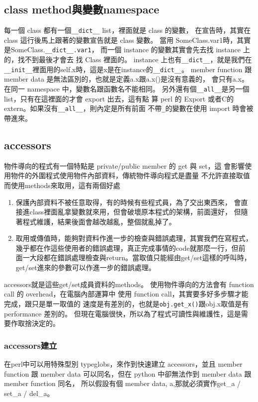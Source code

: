   \subsection{class method與變數namespace}
  每一個 class 都有一個\verb=__dict__= list，裡面就是 class 的變數，
  在宣告時，其實在 class 這行後馬上跟著的變數宣告就是 class 變數。
  當用 SomeClass.var1時，其實是SomeClass.\verb=__dict__.var1=，
  而一個 instance 的變數其實會先去找 instance 上的，找不到最後才會去
  找 Class 裡面的。 instance 上也有\verb=__dict__=，就是我們在
  \verb=__init__=裡面用的self.x時，這是x是在instance的\verb=__dict__=。
  member function 跟 member data 是無法區別的，也就是定義a.x跟a.x()是沒有意義的，
  會只有a.x。在同一 namespace 中，變數名跟函數名不能相同。
  另外還有個\verb=__all__=是另一個 list，只有在這裡面的才會 export 出去，這有點
  算 perl 的 Export 或者C的 extern。如果沒有\verb=__all__=，則內定是所有前面
  不帶\verb=_=的變數在使用 import 時會被帶進來。

  \subsection{accessors}
  物件導向的程式有一個特點是 private/public member 的 get 與 set，這
  會影響使用物件的外圍程式使用物件內部資料，傳統物件導向程式是盡量
  不允許直接取值而使用methods來取用，這有兩個好處
  \begin{enumerate}
  \item 保護內部資料不被任意取得，有的時候有些程式員，為了交出東西來，
    會直接進class裡面亂拿變數就來用，但會破壞原本程式的架構，前面還好，
    但隨著程式維護，結果後面會越改越亂，整個就亂掉了。
  \item 取用或傳值時，能夠對資料作進一步的檢查與錯誤處理，其實我們在寫程式，
    幾乎都在作這些使用者的錯誤處理，真正完成事情的code就那麼一行，但前
    面一大段都在錯誤處理檢查與return。當取值只能經由get/set這樣的呼叫時，
    get/set進來的參數可以作進一步的錯誤處理。
  \end{enumerate}
  accessors就是這些get/set成員資料的methods。
  使用物件導向的方法會有 function call 的 overhead，在電腦內部運算中
  使用 function call，其實要多好多步驟才能完成，跟只是單一取值的
  速度是有差別的，也就是\verb=obj.get_x()=跟obj.x取值是有 performance 差別的。
  但現在電腦很快，所以為了程式可讀性與維護性，這是需要作取捨決定的。

    \subsubsection{accessors建立}
    在perl中可以用特殊型別 typeglobs，來作到快速建立 accessors，並且 member function
    跟 member data 可以同名，但在 python 中卻無法作到 member data 跟 member function 同名，
    所以假設有個 member data, a,那就必須實作get\_a / set\_a / del\_a。

